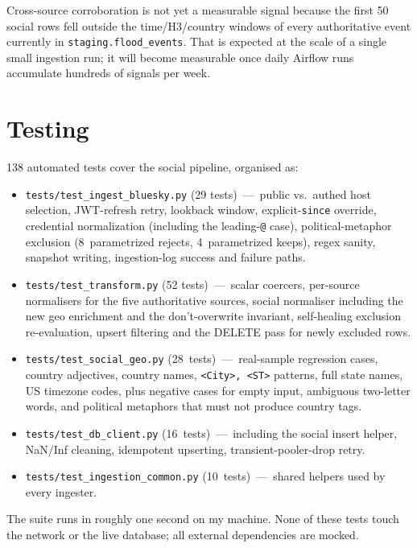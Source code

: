 \documentclass[11pt]{article}
\begin{document}
Cross-source corroboration is not yet a measurable signal because the
first 50 social rows fell outside the time/H3/country windows of every
authoritative event currently in \texttt{staging.flood\_events}.
That is expected at the scale of a single small ingestion run; it will
become measurable once daily Airflow runs accumulate hundreds of
signals per week.

\section{Testing}

138 automated tests cover the social pipeline, organised as:

\begin{itemize}[leftmargin=*]
  \item \texttt{tests/test\_ingest\_bluesky.py} (29 tests)~---~public
        vs.\ authed host selection, JWT-refresh retry, lookback window,
        explicit-\texttt{since} override, credential normalization
        (including the leading-\texttt{@} case),
        political-metaphor exclusion (8~parametrized rejects,
        4~parametrized keeps), regex sanity, snapshot writing,
        ingestion-log success and failure paths.
  \item \texttt{tests/test\_transform.py} (52 tests)~---~scalar
        coercers, per-source normalisers for the five authoritative
        sources, social normaliser including the new geo enrichment
        and the don't-overwrite invariant, self-healing exclusion
        re-evaluation, upsert filtering and the DELETE pass for newly
        excluded rows.
  \item \texttt{tests/test\_social\_geo.py} (28~tests)~---~real-sample
        regression cases, country adjectives, country names,
        \texttt{<City>, <ST>} patterns, full state names, US timezone
        codes, plus negative cases for empty input, ambiguous
        two-letter words, and political metaphors that must not
        produce country tags.
  \item \texttt{tests/test\_db\_client.py} (16~tests)~---~including
        the social insert helper, NaN/Inf cleaning, idempotent
        upserting, transient-pooler-drop retry.
  \item \texttt{tests/test\_ingestion\_common.py}
        (10~tests)~---~shared helpers used by every ingester.
\end{itemize}

The suite runs in roughly one second on my machine. None of these
tests touch the network or the live database; all external dependencies
are mocked.
\end{document}
